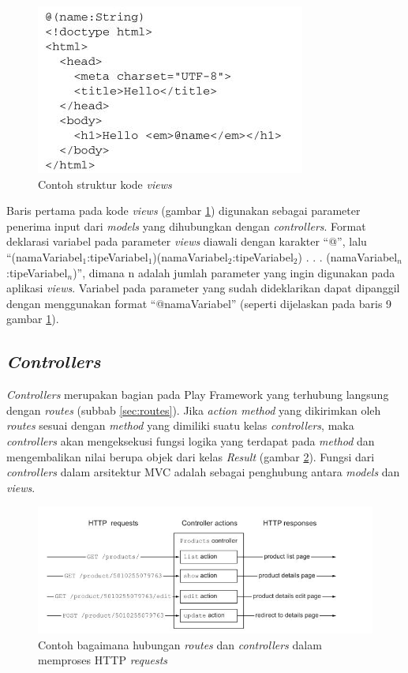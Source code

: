 \begin{figure}[htbp]
	\centering
		\includegraphics[scale=0.8]{Gambar/2_views.JPG}
	\caption{Contoh struktur kode \textit{views}\cite{playforjava}}
	\label{fig:2_views}
\end{figure}

Baris pertama pada kode \textit{views} (gambar \ref{fig:2_views}) digunakan sebagai parameter penerima input dari \textit{models} yang dihubungkan dengan \textit{controllers}. Format deklarasi variabel pada parameter \textit{views} diawali dengan karakter ``@'', lalu ``(namaVariabel$_1$:tipeVariabel$_1$)(namaVariabel$_2$:tipeVariabel$_2$) . . . (namaVariabel$_n$:tipeVariabel$_n$)'', dimana n adalah jumlah parameter yang ingin digunakan pada aplikasi \textit{views}. Variabel pada parameter yang sudah dideklarikan dapat dipanggil dengan menggunakan format ``@namaVariabel'' (seperti dijelaskan pada baris 9 gambar \ref{fig:2_views}).

\subsection{\textit{Controllers}}
\label{sec:controllers}
\textit{Controllers} merupakan bagian pada Play Framework yang terhubung langsung dengan \textit{routes} (subbab \ref{sec:routes}). Jika \textit{action method} yang dikirimkan oleh \textit{routes} sesuai dengan \textit{method} yang dimiliki suatu kelas \textit{controllers}, maka \textit{controllers} akan mengeksekusi fungsi logika yang terdapat pada \textit{method} dan mengembalikan nilai berupa objek dari kelas \textit{Result} (gambar \ref{fig:2_controllers1}). Fungsi dari \textit{controllers} dalam arsitektur MVC adalah sebagai penghubung antara \textit{models} dan \textit{views}. 

\begin{figure}[htbp]
	\centering	
		\includegraphics[scale=0.8]{Gambar/2_controllers1.JPG}
	\caption{Contoh bagaimana hubungan \textit{routes} dan \textit{controllers} dalam memproses HTTP \textit{requests}\cite{playforjava}}
	\label{fig:2_controllers1}
\end{figure}

